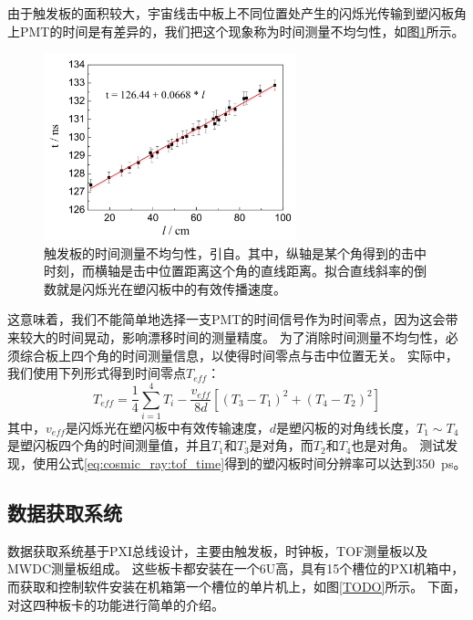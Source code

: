 由于触发板的面积较大，宇宙线击中板上不同位置处产生的闪烁光传输到塑闪板角上PMT的时间是有差异的，我们把这个现象称为时间测量不均匀性，如图\ref{fig:cosmic_ray:tof_timeVSposition}所示。
\begin{figure}[htbp]
	\centering
	\includegraphics[width=0.65\textwidth]{chap/cosmic_ray/fig/tof_timeVSposition.png}
	\caption{触发板的时间测量不均匀性，引自\cite{tang_large_2015}。其中，纵轴是某个角得到的击中时刻，而横轴是击中位置距离这个角的直线距离。拟合直线斜率的倒数就是闪烁光在塑闪板中的有效传播速度。}
	\label{fig:cosmic_ray:tof_timeVSposition}
\end{figure}
这意味着，我们不能简单地选择一支PMT的时间信号作为时间零点，因为这会带来较大的时间晃动，影响漂移时间的测量精度。
为了消除时间测量不均匀性，必须综合板上四个角的时间测量信息，以使得时间零点与击中位置无关。
实际中，我们使用下列形式\cite{annand_large_1987}得到时间零点$T_{eff}$：
\begin{equation}
	T_{eff} = \frac{1}{4}\sum^4_{i=1}T_i - \frac{v_{eff}}{8d}[(T_3-T_1)^2+(T_4-T_2)^2]
	\label{eq:cosmic_ray:tof_time}
\end{equation}
其中，$v_{eff}$是闪烁光在塑闪板中有效传输速度，$d$是塑闪板的对角线长度，$T_1\sim T_4$是塑闪板四个角的时间测量值，并且$T_1$和$T_3$是对角，而$T_2$和$T_4$也是对角。
测试发现，使用公式\ref{eq:cosmic_ray:tof_time}得到的塑闪板时间分辨率可以达到\SI{350}{\pico\second}\cite{tang_large_2015}。

\subsection{数据获取系统}
\label{sec:cosmic_ray:daq_system}
数据获取系统基于PXI总线设计，主要由触发板，时钟板，TOF测量板以及MWDC测量板组成\cite{kanglongfei_thesis,zhoujiawen_thesis}。
这些板卡都安装在一个6U高，具有15个槽位的PXI机箱中\cite{pxi_chassis}，而获取和控制软件安装在机箱第一个槽位的单片机上，如图\ref{TODO}所示。
下面，对这四种板卡的功能进行简单的介绍。

